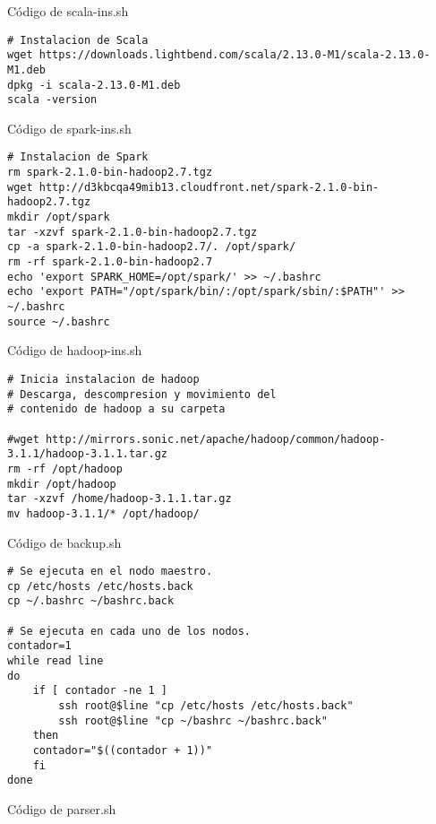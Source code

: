 Código de scala-ins.sh
\begin{lstlisting}
# Instalacion de Scala
wget https://downloads.lightbend.com/scala/2.13.0-M1/scala-2.13.0-M1.deb
dpkg -i scala-2.13.0-M1.deb
scala -version
\end{lstlisting}
Código de spark-ins.sh
\begin{lstlisting}
# Instalacion de Spark
rm spark-2.1.0-bin-hadoop2.7.tgz
wget http://d3kbcqa49mib13.cloudfront.net/spark-2.1.0-bin-hadoop2.7.tgz
mkdir /opt/spark
tar -xzvf spark-2.1.0-bin-hadoop2.7.tgz
cp -a spark-2.1.0-bin-hadoop2.7/. /opt/spark/
rm -rf spark-2.1.0-bin-hadoop2.7
echo 'export SPARK_HOME=/opt/spark/' >> ~/.bashrc
echo 'export PATH="/opt/spark/bin/:/opt/spark/sbin/:$PATH"' >> ~/.bashrc
source ~/.bashrc
\end{lstlisting}
Código de hadoop-ins.sh
\begin{lstlisting}
# Inicia instalacion de hadoop
# Descarga, descompresion y movimiento del
# contenido de hadoop a su carpeta

#wget http://mirrors.sonic.net/apache/hadoop/common/hadoop-3.1.1/hadoop-3.1.1.tar.gz
rm -rf /opt/hadoop
mkdir /opt/hadoop
tar -xzvf /home/hadoop-3.1.1.tar.gz
mv hadoop-3.1.1/* /opt/hadoop/
\end{lstlisting}
Código de backup.sh
\begin{lstlisting}
# Se ejecuta en el nodo maestro.
cp /etc/hosts /etc/hosts.back
cp ~/.bashrc ~/bashrc.back

# Se ejecuta en cada uno de los nodos.
contador=1
while read line
do
	if [ contador -ne 1 ]
		ssh root@$line "cp /etc/hosts /etc/hosts.back"
		ssh root@$line "cp ~/bashrc ~/bashrc.back"
	then
	contador="$((contador + 1))"
	fi 
done
\end{lstlisting}
Código de parser.sh
